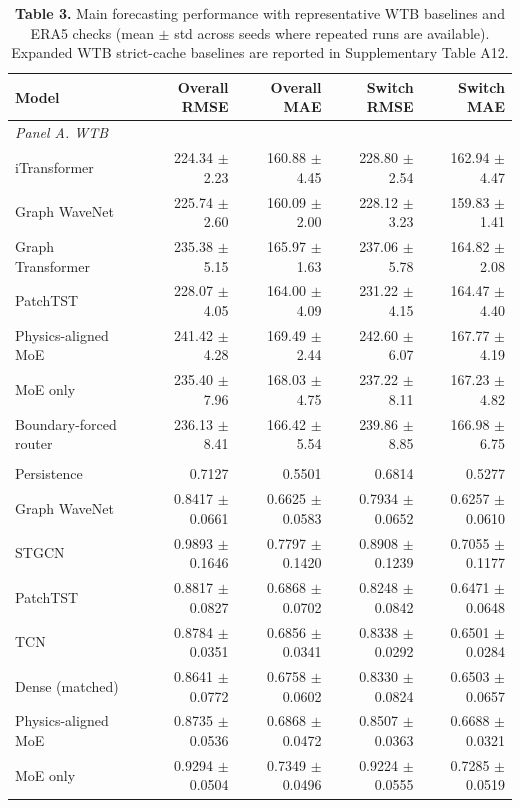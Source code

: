 \begin{table}[t]
\centering
\scriptsize
\setlength{\tabcolsep}{4pt}
\renewcommand{\arraystretch}{1.04}
\caption*{\textbf{Table 3.} Main forecasting performance with representative WTB baselines and ERA5 checks (mean $\pm$ std across seeds where repeated runs are available). Expanded WTB strict-cache baselines are reported in Supplementary Table A12.}
\begin{tabular}{lrrrr}
\toprule
Model & Overall RMSE & Overall MAE & Switch RMSE & Switch MAE \\
\midrule
\multicolumn{5}{l}{\textit{Panel A. WTB}} \\
iTransformer & 224.34 $\pm$ 2.23 & 160.88 $\pm$ 4.45 & 228.80 $\pm$ 2.54 & 162.94 $\pm$ 4.47 \\
Graph WaveNet & 225.74 $\pm$ 2.60 & 160.09 $\pm$ 2.00 & 228.12 $\pm$ 3.23 & 159.83 $\pm$ 1.41 \\
Graph Transformer & 235.38 $\pm$ 5.15 & 165.97 $\pm$ 1.63 & 237.06 $\pm$ 5.78 & 164.82 $\pm$ 2.08 \\
PatchTST & 228.07 $\pm$ 4.05 & 164.00 $\pm$ 4.09 & 231.22 $\pm$ 4.15 & 164.47 $\pm$ 4.40 \\
Physics-aligned MoE & 241.42 $\pm$ 4.28 & 169.49 $\pm$ 2.44 & 242.60 $\pm$ 6.07 & 167.77 $\pm$ 4.19 \\
MoE only & 235.40 $\pm$ 7.96 & 168.03 $\pm$ 4.75 & 237.22 $\pm$ 8.11 & 167.23 $\pm$ 4.82 \\
Boundary-forced router & 236.13 $\pm$ 8.41 & 166.42 $\pm$ 5.54 & 239.86 $\pm$ 8.85 & 166.98 $\pm$ 6.75 \\
\addlinespace[2pt]
\multicolumn{5}{l}{\textit{Panel B. ERA5}} \\
Persistence & 0.7127 & 0.5501 & 0.6814 & 0.5277 \\
Graph WaveNet & 0.8417 $\pm$ 0.0661 & 0.6625 $\pm$ 0.0583 & 0.7934 $\pm$ 0.0652 & 0.6257 $\pm$ 0.0610 \\
STGCN & 0.9893 $\pm$ 0.1646 & 0.7797 $\pm$ 0.1420 & 0.8908 $\pm$ 0.1239 & 0.7055 $\pm$ 0.1177 \\
PatchTST & 0.8817 $\pm$ 0.0827 & 0.6868 $\pm$ 0.0702 & 0.8248 $\pm$ 0.0842 & 0.6471 $\pm$ 0.0648 \\
TCN & 0.8784 $\pm$ 0.0351 & 0.6856 $\pm$ 0.0341 & 0.8338 $\pm$ 0.0292 & 0.6501 $\pm$ 0.0284 \\
Dense (matched) & 0.8641 $\pm$ 0.0772 & 0.6758 $\pm$ 0.0602 & 0.8330 $\pm$ 0.0824 & 0.6503 $\pm$ 0.0657 \\
Physics-aligned MoE & 0.8735 $\pm$ 0.0536 & 0.6868 $\pm$ 0.0472 & 0.8507 $\pm$ 0.0363 & 0.6688 $\pm$ 0.0321 \\
MoE only & 0.9294 $\pm$ 0.0504 & 0.7349 $\pm$ 0.0496 & 0.9224 $\pm$ 0.0555 & 0.7285 $\pm$ 0.0519 \\
\bottomrule
\end{tabular}
\end{table}
